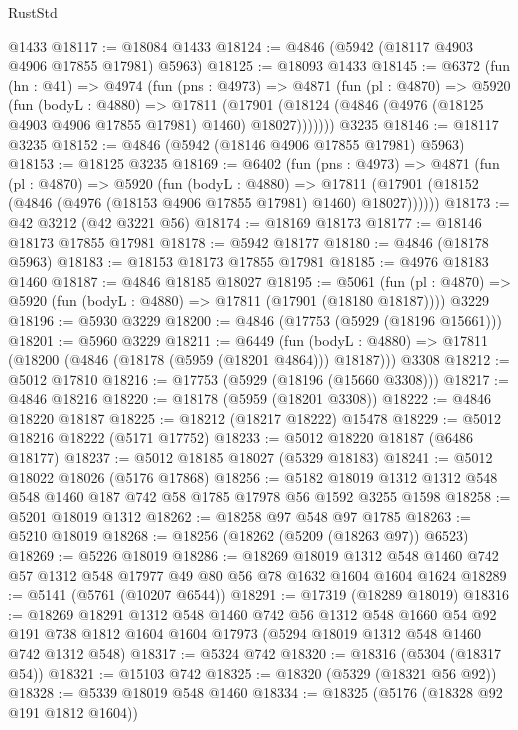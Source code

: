\begin{lexlean}{RustStd}
\begin{coremodule}
    @1433
@18117 := @18084 @1433
@18124 := @4846 (@5942 (@18117 @4903 @4906 @17855 @17981) @5963)
@18125 := @18093 @1433
@18145 := @6372
    (fun (hn : @41) =>
    @4974
      (fun (pns : @4973) =>
      @4871
        (fun (pl : @4870) =>
        @5920
          (fun (bodyL : @4880) =>
          @17811
            (@17901 (@18124 (@4846 (@4976 (@18125 @4903 @4906 @17855 @17981) @1460) @18027)))))))
    @3235
@18146 := @18117 @3235
@18152 := @4846 (@5942 (@18146 @4906 @17855 @17981) @5963)
@18153 := @18125 @3235
@18169 := @6402
    (fun (pns : @4973) =>
    @4871
      (fun (pl : @4870) =>
      @5920
        (fun (bodyL : @4880) =>
        @17811 (@17901 (@18152 (@4846 (@4976 (@18153 @4906 @17855 @17981) @1460) @18027))))))
@18173 := @42 @3212 (@42 @3221 @56)
@18174 := @18169 @18173
@18177 := @18146 @18173 @17855 @17981
@18178 := @5942 @18177
@18180 := @4846 (@18178 @5963)
@18183 := @18153 @18173 @17855 @17981
@18185 := @4976 @18183 @1460
@18187 := @4846 @18185 @18027
@18195 := @5061
    (fun (pl : @4870) => @5920 (fun (bodyL : @4880) => @17811 (@17901 (@18180 @18187))))
    @3229
@18196 := @5930 @3229
@18200 := @4846 (@17753 (@5929 (@18196 @15661)))
@18201 := @5960 @3229
@18211 := @6449
    (fun (bodyL : @4880) => @17811 (@18200 (@4846 (@18178 (@5959 (@18201 @4864))) @18187)))
    @3308
@18212 := @5012 @17810
@18216 := @17753 (@5929 (@18196 (@15660 @3308)))
@18217 := @4846 @18216
@18220 := @18178 (@5959 (@18201 @3308))
@18222 := @4846 @18220 @18187
@18225 := @18212 (@18217 @18222) @15478
@18229 := @5012 @18216 @18222 (@5171 @17752)
@18233 := @5012 @18220 @18187 (@6486 @18177)
@18237 := @5012 @18185 @18027 (@5329 @18183)
@18241 := @5012 @18022 @18026 (@5176 @17868)
@18256 := @5182 @18019 @1312 @1312 @548 @548 @1460 @187 @742 @58 @1785 @17978 @56 @1592 @3255 @1598
@18258 := @5201 @18019 @1312
@18262 := @18258 @97 @548 @97 @1785
@18263 := @5210 @18019
@18268 := @18256 (@18262 (@5209 (@18263 @97)) @6523)
@18269 := @5226 @18019
@18286 := @18269
    @18019
    @1312
    @548
    @1460
    @742
    @57
    @1312
    @548
    @17977
    @49
    @80
    @56
    @78
    @1632
    @1604
    @1604
    @1624
@18289 := @5141 (@5761 (@10207 @6544))
@18291 := @17319 (@18289 @18019)
@18316 := @18269
    @18291
    @1312
    @548
    @1460
    @742
    @56
    @1312
    @548
    @1660
    @54
    @92
    @191
    @738
    @1812
    @1604
    @1604
    @17973
    (@5294 @18019 @1312 @548 @1460 @742 @1312 @548)
@18317 := @5324 @742
@18320 := @18316 (@5304 (@18317 @54))
@18321 := @15103 @742
@18325 := @18320 (@5329 (@18321 @56 @92))
@18328 := @5339 @18019 @548 @1460
@18334 := @18325 (@5176 (@18328 @92 @191 @1812 @1604))

\end{coremodule}
\end{lexlean}
